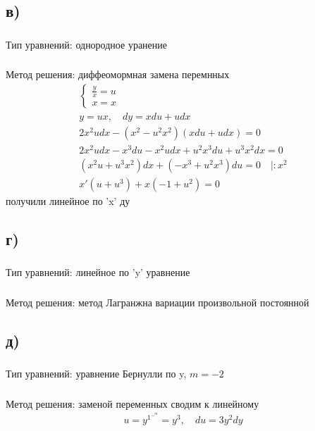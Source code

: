 \documentclass{article}
\begin{document}
\subsection*{в)}
\subsubsection*{} 
Тип уравнений: однородное уранение

\subsubsection*{}
Метод решения: диффеомормная замена перемнных
\begin{gather*}
\begin{cases}
\frac{y}{x}=u \\
x=x
\end{cases}\\
y=ux, \label{pd} \quad   dy=xdu+udx  \\
    2x^2udx-(x^2-u^2x^2)(xdu+udx)=0 \\
    2x^2udx-x^3du-x^2udx+u^2x^3du+u^3x^2dx=0 \\
    (x^2u+u^3x^2)dx+(-x^3+u^2x^3)du=0 \quad |:x^2 \\
    x'(u+u^3)+x(-1+u^2)=0 
\end{gather*}
получили линейное по 'x' ду

\subsection*{г)}
\subsubsection*{} 
Тип уравнений: линейное по 'y' уравнение 

\subsubsection*{}
Метод решения: метод Лагранжна вариации произвольной постоянной

\subsection*{д)}
\subsubsection*{} 
Тип уравнений: уравнение Бернулли по y, $m=-2$

\subsubsection*{}
Метод решения: заменой переменных сводим к линейному
\begin{gather*}
    u=y^1^-^m=y^3, \label{pd} \quad   du=3y^2dy
\end{gather*}
\end{document}
